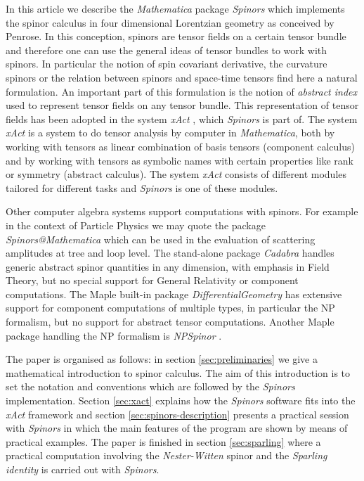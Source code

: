 \documentclass[final,3p,times,twocolumn]{elsarticle}
\begin{document}
In this article we describe the {\em Mathematica} package {\em Spinors} which 
implements the spinor calculus in four dimensional Lorentzian geometry as
conceived by Penrose. In this conception, spinors are tensor fields
on a certain tensor bundle and therefore one can use the general ideas
of tensor bundles to work with spinors. In particular the notion of 
spin covariant derivative, the curvature spinors or the relation between spinors
and space-time tensors find here a natural formulation. An important part of 
this formulation is the notion of {\em abstract index} used to represent tensor
fields on any tensor bundle. This representation of tensor fields  has been 
adopted in the system {\em xAct} \cite{XACT}, which {\em Spinors} is part of. 
The system {\em xAct} is a system to do tensor analysis by computer in
{\em Mathematica}, both by working with tensors as linear combination
of basis tensors (component calculus) and by working with tensors as
symbolic names with certain properties like rank or symmetry (abstract
calculus). The system {\em xAct} consists of different modules tailored
for different tasks and {\em Spinors} is one of these modules.     

Other computer algebra systems support computations with spinors.
For example in the context of Particle Physics we may quote the package
{\em Spinors@Mathematica} \cite{MS} which can be used in the evaluation
of scattering amplitudes at tree and loop level.
The stand-alone package {\em Cadabra} \cite{CADABRA} handles generic
abstract spinor quantities in any dimension, with emphasis in Field
Theory, but no special support for General Relativity or component
computations.
The Maple built-in package {\em DifferentialGeometry} has extensive
support for component computations of multiple types, in particular
the NP formalism, but no support for abstract tensor computations.
Another Maple package handling the NP formalism is {\em NPSpinor}
\cite{NPSPINOR}.


The paper is organised as follows: in section \ref{sec:preliminaries} 
we give a 
mathematical introduction to spinor calculus. The aim of this introduction 
is to set the notation and conven\-tions which are followed by the {\em Spinors} 
implementation. Section \ref{sec:xact} explains how the {\em Spinors} software
fits into the {\em xAct} framework and section \ref{sec:spinors-description} presents
a practical session with {\em Spinors} in which the main features of 
the program are shown by means of practical examples. The paper is finished in 
section \ref{sec:sparling} where a practical computation involving the 
{\em Nester-Witten} spinor and the {\em Sparling identity}  
is carried out with
{\em Spinors}. 
\end{document}
